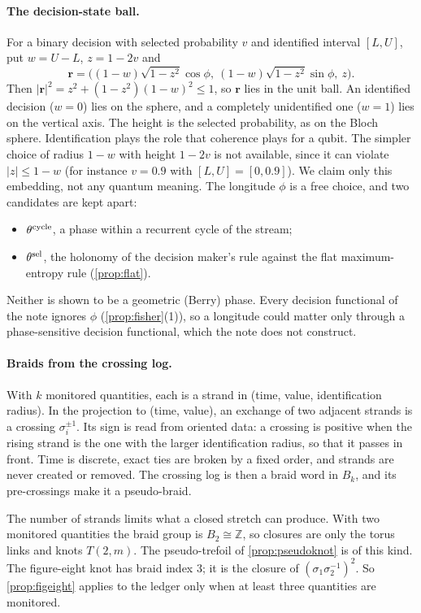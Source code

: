 \documentclass[11pt]{article}
\theoremstyle{definition}\newtheorem{definition}[theorem]{Definition}\newtheorem{remark}[theorem]{Remark}\newtheorem{example}[theorem]{Example}\newtheorem{problem}[theorem]{Open problem}\crefname{problem}{Problem}{Problems}
\begin{document}
\paragraph{The decision-state ball.} For a binary decision with selected probability $v$ and identified interval $[L,U]$, put $w=U-L$, $z=1-2v$ and
\[
\mathbf r=\big((1-w)\sqrt{1-z^2}\cos\phi,\ (1-w)\sqrt{1-z^2}\sin\phi,\ z\big).
\]
Then $|\mathbf r|^2=z^2+(1-z^2)(1-w)^2\le1$, so $\mathbf r$ lies in the unit ball. An identified decision ($w=0$) lies on the sphere, and a completely unidentified one ($w=1$) lies on the vertical axis. The height is the selected probability, as on the Bloch sphere. Identification plays the role that coherence plays for a qubit. The simpler choice of radius $1-w$ with height $1-2v$ is not available, since it can violate $|z|\le1-w$ (for instance $v=0.9$ with $[L,U]=[0,0.9]$). We claim only this embedding, not any quantum meaning. The longitude $\phi$ is a free choice, and two candidates are kept apart:
\begin{itemize}
\item $\theta^{\rm cycle}$, a phase within a recurrent cycle of the stream;
\item $\theta^{\rm sel}$, the holonomy of the decision maker's rule against the flat maximum-entropy rule (\cref{prop:flat}).
\end{itemize}
Neither is shown to be a geometric (Berry) phase. Every decision functional of the note ignores $\phi$ (\cref{prop:fisher}(1)), so a longitude could matter only through a phase-sensitive decision functional, which the note does not construct.

\paragraph{Braids from the crossing log.} With $k$ monitored quantities, each is a strand in (time, value, identification radius). In the projection to (time, value), an exchange of two adjacent strands is a crossing $\sigma_i^{\pm1}$. Its sign is read from oriented data: a crossing is positive when the rising strand is the one with the larger identification radius, so that it passes in front. Time is discrete, exact ties are broken by a fixed order, and strands are never created or removed. The crossing log is then a braid word in $B_k$, and its pre-crossings make it a pseudo-braid.

The number of strands limits what a closed stretch can produce. With two monitored quantities the braid group is $B_2\cong\mathbb Z$, so closures are only the torus links and knots $T(2,m)$. The pseudo-trefoil of \cref{prop:pseudoknot} is of this kind. The figure-eight knot has braid index $3$; it is the closure of $(\sigma_1\sigma_2^{-1})^2$. So \cref{prop:figeight} applies to the ledger only when at least three quantities are monitored.
\end{document}
